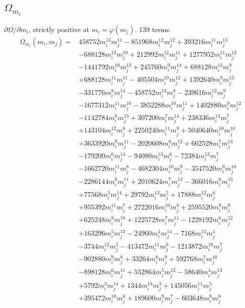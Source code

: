 \subsection*{$\Omega_{m_i}$}
$\partial\Omega/\partial m_i$, strictly positive at $m_i=\varphi(m_j)$. 139 terms.
{\small
\begin{align*}
\Omega_{m_i}(m_i,m_j)={}&458752m_i^{13}m_j^{11}-851968m_i^{12}m_j^{12}+393216m_i^{11}m_j^{13}\\
&-688128m_i^{13}m_j^{10}+212992m_i^{12}m_j^{11}+1277952m_i^{11}m_j^{12}\\
&-1441792m_i^{10}m_j^{13}+245760m_i^{9}m_j^{14}+688128m_i^{13}m_j^{9}\\
&+688128m_i^{11}m_j^{11}-405504m_i^{10}m_j^{12}+1392640m_i^{9}m_j^{13}\\
&-331776m_i^{8}m_j^{14}-458752m_i^{13}m_j^{8}-239616m_i^{12}m_j^{9}\\
&-1677312m_i^{11}m_j^{10}-3852288m_i^{10}m_j^{11}+1402880m_i^{9}m_j^{12}\\
&-1142784m_i^{8}m_j^{13}+307200m_i^{7}m_j^{14}+238336m_i^{13}m_j^{7}\\
&+143104m_i^{12}m_j^{8}+2250240m_i^{11}m_j^{9}+5040640m_i^{10}m_j^{10}\\
&+3633920m_i^{9}m_j^{11}-2020608m_i^{8}m_j^{12}+662528m_i^{7}m_j^{13}\\
&-179200m_i^{6}m_j^{14}-94080m_i^{13}m_j^{6}-72384m_i^{12}m_j^{7}\\
&-1662720m_i^{11}m_j^{8}-4682304m_i^{10}m_j^{9}-3547520m_i^{9}m_j^{10}\\
&-2286144m_i^{8}m_j^{11}+2010624m_i^{7}m_j^{12}-366016m_i^{6}m_j^{13}\\
&+77568m_i^{5}m_j^{14}+29792m_i^{13}m_j^{5}+17888m_i^{12}m_j^{6}\\
&+955392m_i^{11}m_j^{7}+2722016m_i^{10}m_j^{8}+2595520m_i^{9}m_j^{9}\\
&+625248m_i^{8}m_j^{10}+1225728m_i^{7}m_j^{11}-1228192m_i^{6}m_j^{12}\\
&+163296m_i^{5}m_j^{13}-24960m_i^{4}m_j^{14}-7168m_i^{13}m_j^{4}\\
&-3744m_i^{12}m_j^{5}-413472m_i^{11}m_j^{6}-1213872m_i^{10}m_j^{7}\\
&-902880m_i^{9}m_j^{8}+33264m_i^{8}m_j^{9}+592768m_i^{7}m_j^{10}\\
&-898128m_i^{6}m_j^{11}+552864m_i^{5}m_j^{12}-58640m_i^{4}m_j^{13}\\
&+5792m_i^{3}m_j^{14}+1344m_i^{13}m_j^{3}+145056m_i^{11}m_j^{5}\\
&+395472m_i^{10}m_j^{6}+189600m_i^{9}m_j^{7}-603648m_i^{8}m_j^{8}\\

\end{align*}}

